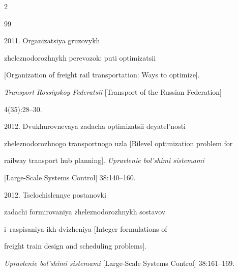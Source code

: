   \begin{multicols}{2}





\renewcommand{\bibname}{\protect\rmfamily References}







{\small\frenchspacing


 {%




 \begin{thebibliography}{99}







 2011. Organizatsiya gruzovykh 


zheleznodorozhnykh perevozok: puti optimizatsii 


[Organization of freight rail transportation: Ways to optimize].


\textit{Transport Rossiyskoy Federatsii} [Transport of the Russian Federation]


4(35):28--30.






2012. Dvukhurovnevaya zadacha optimizatsii deyatel'nosti 


zhe\-lez\-no\-do\-rozh\-no\-go transportnogo uzla [Bilevel optimization problem for 


railway transport hub planning]. \textit{Upravlenie bol'shimi sistemami}


[Large-Scale Systems Control] 38:140--160.




 2012. Tselochislennye postanovki 


zadachi formirovaniya zheleznodorozhnykh sostavov 


i~raspisaniya ikh dvizheniya [Integer formulations of


 freight train design and scheduling problems].


 \textit{Upravlenie bol'shimi sistemami} [Large-Scale Systems Control] 38:161--169.





\end{thebibliography}}}
\end{multicols}
